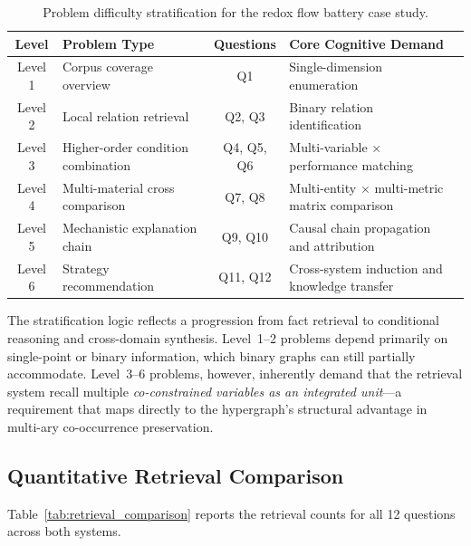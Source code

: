 \begin{table}[htbp]
\centering
\caption{Problem difficulty stratification for the redox flow battery case study.}
\label{tab:difficulty_levels}
\begin{tabular}{@{}clclp{4.5cm}@{}}
\toprule
\textbf{Level} & \textbf{Problem Type} & \textbf{Questions} & \textbf{Core Cognitive Demand} \\
\midrule
Level 1 & Corpus coverage overview & Q1 & Single-dimension enumeration \\
Level 2 & Local relation retrieval & Q2, Q3 & Binary relation identification \\
Level 3 & Higher-order condition combination & Q4, Q5, Q6 & Multi-variable $\times$ performance matching \\
Level 4 & Multi-material cross comparison & Q7, Q8 & Multi-entity $\times$ multi-metric matrix comparison \\
Level 5 & Mechanistic explanation chain & Q9, Q10 & Causal chain propagation and attribution \\
Level 6 & Strategy recommendation & Q11, Q12 & Cross-system induction and knowledge transfer \\
\bottomrule
\end{tabular}
\end{table}

The stratification logic reflects a progression from fact retrieval to conditional reasoning and cross-domain synthesis. Level~1--2 problems depend primarily on single-point or binary information, which binary graphs can still partially accommodate. Level~3--6 problems, however, inherently demand that the retrieval system recall multiple \emph{co-constrained variables as an integrated unit}---a requirement that maps directly to the hypergraph's structural advantage in multi-ary co-occurrence preservation.

\subsection{Quantitative Retrieval Comparison}
\label{subsec:flow_battery_quantitative}

Table~\ref{tab:retrieval_comparison} reports the retrieval counts for all 12 questions across both systems.

